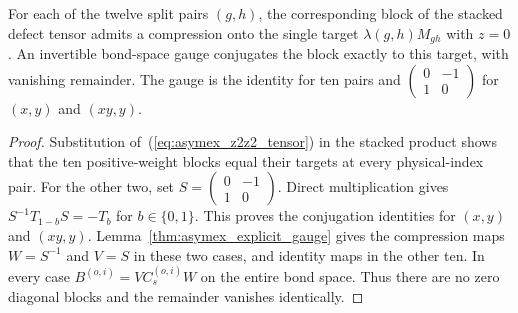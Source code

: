 \begin{lemma}%
    \label{thm:asymex_z2z2_split}
    \leanok
    For each of the twelve split pairs $(g,h)$, the corresponding block
    of the stacked defect tensor admits a compression onto the single
    target $\lambda(g,h)M_{gh}$ with $z=0$.
    An invertible bond-space gauge conjugates the block exactly to this
    target, with vanishing remainder. The gauge is the identity for ten
    pairs and $\begin{pmatrix}0&-1\\1&0\end{pmatrix}$ for $(x,y)$ and
    $(xy,y)$.
\end{lemma}

\begin{proof}
    \leanok
    Substitution of~(\ref{eq:asymex_z2z2_tensor}) in the stacked
    product shows that the ten positive-weight blocks equal their
    targets at every physical-index pair.
    For the other two, set
    $S=\begin{pmatrix}0&-1\\1&0\end{pmatrix}$.
    Direct multiplication gives $S^{-1}T_{1-b}S=-T_b$ for
    $b\in\{0,1\}$. This proves the conjugation identities for
    $(x,y)$ and $(xy,y)$.
    Lemma~\ref{thm:asymex_explicit_gauge} gives the compression
    maps $W=S^{-1}$ and $V=S$ in these two cases, and identity maps
    in the other ten.
    In every case $B^{(o,i)}=VC_s^{(o,i)}W$ on the entire bond
    space. Thus there are no zero diagonal blocks and the remainder
    vanishes identically.
\end{proof}

